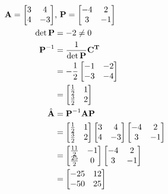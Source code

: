 \documentclass{article}
\begin{document}
\begin{align}
    \label{eq:1}
    && \textbf{A} = \begin{bmatrix} 3&4\\4&-3\end{bmatrix} &\text{,  } \textbf{P} = \begin{bmatrix} -4&2\\3&-1\end{bmatrix}
    \\
    \label{eq:2}
    && \det{\textbf{P}} &= -2 \neq 0
    \\
    \label{eq:3}
    && \textbf{P}^{-1} &= \frac{1}{\det\textbf{P}}\textbf{C\textsuperscript{T}}
    \\
    \label{eq:4}
    && &= -\frac{1}{2}\begin{bmatrix} -1 & -2\\-3 & -4 \end{bmatrix}
    \\
    \label{eq:5}
    && &= \begin{bmatrix} \frac{1}{2} & 1\\ \frac{3}{2}&2 \end{bmatrix}
    \\
    \label{eq:6}
    &&\hat{\textbf{A}} &= \textbf{P}^{-1}\textbf{AP}
    \\
    \label{eq:7}
    && &= 
    \begin{bmatrix}\frac{1}{2}&1\\\frac{3}{2}&2\end{bmatrix}
    \begin{bmatrix}
    3&4\\4&-3
    \end{bmatrix}
    \begin{bmatrix}
    -4&2\\3&-1
    \end{bmatrix}
    \\
    \label{eq:8}
    && &= \begin{bmatrix}
    \frac{11}{2}&-1\\ \frac{25}{2}&0
    \end{bmatrix}\begin{bmatrix}
    -4&2\\3&-1
    \end{bmatrix}
    \\
    \label{eq:9}
    && &= \begin{bmatrix}
    -25 & 12\\ -50 & 25
    \end{bmatrix}
\end{align}
\end{document}
